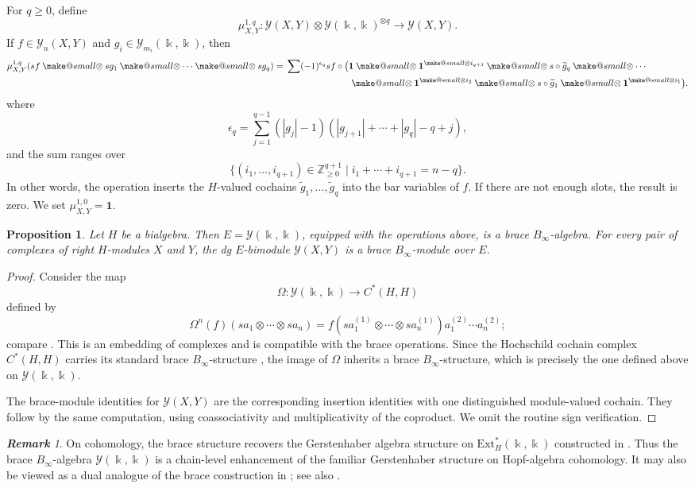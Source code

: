 \documentclass[a4paper, 11pt]{amsart}
\makeatletter
\newtheorem{prop}[thm]{Proposition}
\theoremstyle{definition}
\theoremstyle{remark}
\newtheorem{rem}[thm]{\bf Remark}
\numberwithin{equation}{section}
\newcommand{\Ext}{\mathrm{Ext}}
\newcommand{\Y}{\mathcal{Y}}
\newcommand{\id}{\mathbf{1}}
\newcommand{\g}{\widetilde{g}}
\newcommand{\smallotimes}{\mathbin{\mathpalette\make@small\otimes}}
\newcommand{\make@small}[2]{%
  \vcenter{\hbox{%
    $\m@th\ifx#1\displaystyle\scriptstyle\else\ifx#1\textstyle\scriptstyle
     \else\scriptscriptstyle\fi\fi#2$%
  }}%
}
\makeatother
\begin{document}
For $q\geq0$, define
\[
\mu^{1,q}_{X,Y}\colon
\Y(X,Y)\otimes\Y(\Bbbk,\Bbbk)^{\otimes q}
\longrightarrow\Y(X,Y).
\]
If $f\in\Y_n(X,Y)$ and $g_i\in\Y_{m_i}(\Bbbk,\Bbbk)$, then
\begin{align}\label{align:mupqformular}
\mu^{1,q}_{X,Y}(sf\smallotimes sg_1\smallotimes\dotsb\smallotimes sg_q)
 ={}&\sum(-1)^{\epsilon_q}sf\circ
 \bigl(\id\smallotimes\id^{\smallotimes i_{q+1}}\smallotimes s\circ\g_q
 \smallotimes\cdots \notag\\
 &\hspace{7em}\smallotimes\id^{\smallotimes i_2}\smallotimes s\circ\g_1
 \smallotimes\id^{\smallotimes i_1}\bigr).
\end{align}
where
\[
\epsilon_q=\sum_{j=1}^{q-1}(|g_j|-1)(|g_{j+1}|+\cdots+|g_q|-q+j),
\]
and the sum ranges over
\[
\bigl\{(i_1,\dotsc,i_{q+1})\in\mathbb Z_{\geq0}^{q+1}
 \mid i_1+\cdots+i_{q+1}=n-q\bigr\}.
\]
In other words, the operation inserts the $H$-valued cochains $\widetilde g_1,\dotsc,\widetilde g_q$ into the bar variables of $f$. If there are not enough slots, the result is zero. We set $\mu^{1,0}_{X,Y}=\id$.

\begin{prop}\label{prop:bracestructure}
Let $H$ be a bialgebra. Then $E=\Y(\Bbbk,\Bbbk)$, equipped with the operations above, is a brace $B_\infty$-algebra. For every pair of complexes of right $H$-modules $X$ and $Y$, the dg $E$-bimodule $\Y(X,Y)$ is a brace $B_\infty$-module over $E$.
\end{prop}
\begin{proof}
Consider the map
\[
\Omega\colon\Y(\Bbbk,\Bbbk)\longrightarrow C^*(H,H)
\]
defined by
\[
\Omega^n(f)(sa_1\otimes\cdots\otimes sa_n)
 =f(sa_1^{(1)}\otimes\cdots\otimes sa_n^{(1)})a_1^{(2)}\cdots a_n^{(2)};
\]
compare \cite[Proposition 2.3]{LMSS}. This is an embedding of complexes and is compatible with the brace operations. Since the Hochschild cochain complex $C^*(H,H)$ carries its standard brace $B_\infty$-structure \cite{GeVo}, the image of $\Omega$ inherits a brace $B_\infty$-structure, which is precisely the one defined above on $\Y(\Bbbk,\Bbbk)$.

The brace-module identities for $\Y(X,Y)$ are the corresponding insertion identities with one distinguished module-valued cochain. They follow by the same computation, using coassociativity and multiplicativity of the coproduct. We omit the routine sign verification.
\end{proof}

\begin{rem}
On cohomology, the brace structure recovers the Gerstenhaber algebra structure on $\Ext_H^*(\Bbbk,\Bbbk)$ constructed in \cite{FaSo}. Thus the brace $B_\infty$-algebra $\Y(\Bbbk,\Bbbk)$ is a chain-level enhancement of the familiar Gerstenhaber structure on Hopf-algebra cohomology. It may also be viewed as a dual analogue of the brace construction in \cite[Section 5]{Kad}; see also \cite[Section 2]{Yo}.
\end{rem}
\end{document}

